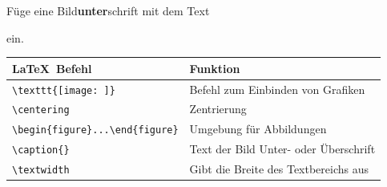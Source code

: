 \documentclass["WS\space 16-17\space -\space LaTeX-Kurs\space -\space Praesentation\space -\space 2.tex"]{subfiles}
\begin{document}
\begin{frame}[fragile]
	\Aufgabee
		Füge eine Bild\textbf{unter}schrift mit dem Text
		
		\textrm{}
		
		ein.
	\btVFill\Befehle
	\begin{center}
		\begin{tabular}{ll}
			\toprule
			\LaTeX\ Befehl								&	Funktion								\\ \midrule
			\lstinline|\texttt{[image: ]}|			&	Befehl zum Einbinden von Grafiken		\\ 
			\lstinline|\centering|						&	Zentrierung								\\
			\lstinline|\begin{figure}...\end{figure}|	&	Umgebung für Abbildungen				\\
			\lstinline|\caption{}|						&	Text der Bild Unter- oder Überschrift	\\
			\lstinline|\textwidth|						&	Gibt die Breite des Textbereichs aus	\\
			\bottomrule
		\end{tabular}
	\end{center}
	\vspace{0.1cm}
\end{frame}
\end{document}
